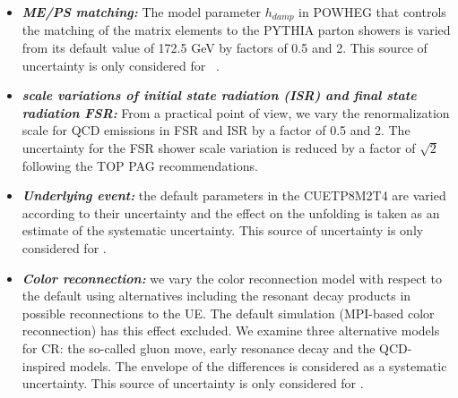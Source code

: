 \begin{itemize}
  \item \textit{\textbf{ME/PS matching:}} The model parameter $h_{damp}$ in
POWHEG that controls the matching of the matrix elements to the PYTHIA parton showers is varied from its default value of 172.5 GeV
by factors of 0.5 and 2. This source of uncertainty is only considered for \ttbar~.
  \item \textit{\textbf{scale variations of initial state radiation (ISR) and final state radiation FSR: }} From a practical point of view, we vary the renormalization scale for QCD emissions in  FSR and ISR by a factor of 0.5 and 2. The uncertainty for the FSR shower scale variation is reduced by a factor of $\sqrt{2}$ following the TOP PAG recommendations.
  \item \textit{\textbf{Underlying event:}} the default parameters in the CUETP8M2T4 are varied according to their uncertainty and the effect on the unfolding is taken as an estimate of the systematic uncertainty. This source of uncertainty is only considered for \ttbar.
  \item \textit{\textbf{Color reconnection:}} we vary the color reconnection model with respect to the default using alternatives including the resonant decay products in possible reconnections to the UE. The default simulation (MPI-based color reconnection) has this effect excluded. We examine three alternative models for CR: the so-called gluon move, early resonance decay and the QCD-inspired models. The envelope of the differences is considered as a systematic uncertainty. This source of uncertainty is only considered for \ttbar.
\end{itemize}

